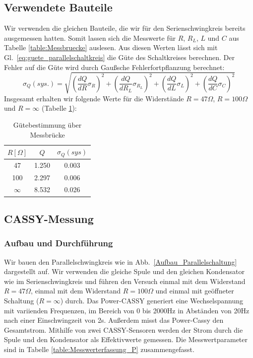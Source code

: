 \documentclass[12pt,a4paper]{article}
\begin{document}
\subsection{Verwendete Bauteile}
Wir verwenden die gleichen Bauteile, die wir für den Serienschwingkreis bereits ausgemessen hatten. Somit lassen sich die Messwerte für $R$, $R_L$, $L$ und $C$ aus Tabelle \ref{table:Messbruecke} auslesen. Aus diesen Werten lässt sich mit Gl.~\eqref{eq:guete_parallelschaltkreis} die Güte des Schaltkreises berechnen. Der Fehler auf die Güte wird durch Gaußsche Fehlerfortpflanzung berechnet:
\begin{equation}
\sigma_Q(sys.)=\sqrt{\left(\frac{dQ}{dR}\sigma_R\right)^2+\left(\frac{dQ}{dR_L}\sigma_{R_L}\right)^2+\left(\frac{dQ}{dL}\sigma_L\right)^2+\left(\frac{dQ}{dC}\sigma_C\right)^2}
\end{equation}
Insgesamt erhalten wir folgende Werte für die Widerstände $R=47\Omega$, $R=100\Omega$ und $R=\infty$ (Tabelle \ref{table:guete_messbruecke_P}):
\begin{table}[H]
	\centering
	\begin{tabular}{|c|c|c|}
		\hline
		$R[\Omega]$&$Q$&$\sigma_Q(sys)$\\
		\hline
		47&1.250&0.003\\
		100&2.297&0.006\\
		$\infty$&8.532&0.026\\
		\hline
	\end{tabular}
	\caption{Gütebestimmung über Messbrücke}
	\label{table:guete_messbruecke_P}
\end{table}

\subsection{CASSY-Messung}
\subsubsection{Aufbau und Durchführung}
Wir bauen den Parallelschwingkreis wie in Abb.~\ref{Aufbau_Parallelschaltung} dargestellt auf. Wir verwenden die gleiche Spule und den gleichen Kondensator wie im Serienschwingkreis und führen den Versuch einmal mit dem Widerstand $R=47\Omega$, einmal mit dem Widerstand $R=100\Omega$ und einmal mit geöffneter Schaltung ($R=\infty$) durch. Das Power-CASSY generiert eine Wechselspannung mit variienden Frequenzen, im Bereich von 0 bis 2000Hz in Abständen von 20Hz nach einer Einschwingzeit von 2s. Außerdem misst das Power-Cassy den Gesamtstrom. Mithilfe von zwei CASSY-Sensoren werden der Strom durch die Spule und den Kondensator als Effektivwerte gemessen. Die Messwertparameter sind in Tabelle \ref{table:Messwerterfassung_P} zusammengefasst.
\end{document}
